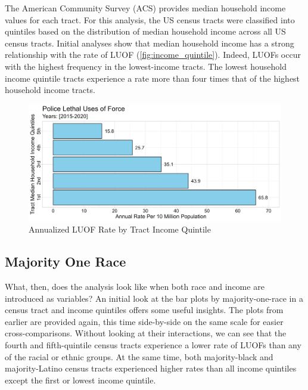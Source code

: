 \documentclass[12pt]{article}
\begin{document}
The American Community Survey (ACS) provides median household income values for each tract. For this analysis, the US census tracts were classified into quintiles based on the distribution of median household income across all US census tracts. Initial analyses show that median household income has a strong relationship with the rate of LUOF (\autoref{fig:income_quintile}). Indeed, LUOFs occur with the highest frequency in the lowest-income tracts. The lowest household income quintile tracts experience a rate more than four times that of the highest household income tracts.

\begin{figure}[H]
  \centering %
  \includegraphics[width=\linewidth]{images/income_quintiles_only_ind}
  \captionsetup{justification=centering, singlelinecheck=false, margin=2cm}
  \caption[Annualized LUOF Rate by Tract Income Quintile]{Annualized LUOF Rate by Tract Income Quintile}
  \label{fig:income_quintile}
\end{figure}

\subsection{Majority One Race}

What, then, does the analysis look like when both race and income are introduced as variables? An initial look at the bar plots by majority-one-race in a census tract and income quintiles offers some useful insights. The plots from earlier are provided again, this time side-by-side on the same scale for easier cross-comparisons. Without looking at their interactions, we can see that the fourth and fifth-quintile census tracts experience a lower rate of LUOFs than any of the racial or ethnic groups. At the same time, both majority-black and majority-Latino census tracts experienced higher rates than all income quintiles except the first or lowest income quintile.
\end{document}
